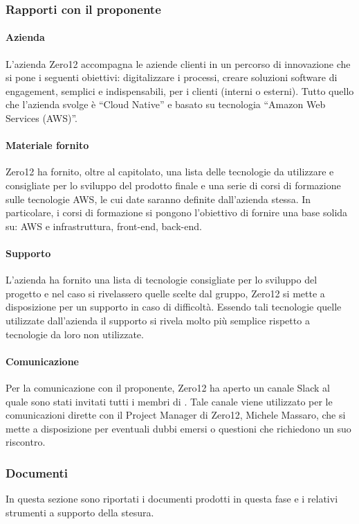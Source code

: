 \subsubsection{Rapporti con il proponente}
\paragraph{Azienda}
L’azienda Zero12 accompagna le aziende clienti in un percorso di innovazione che si pone i
seguenti obiettivi: digitalizzare i processi, creare soluzioni software di engagement, semplici e indispensabili, per i clienti (interni o esterni). Tutto quello che l’azienda svolge è “Cloud Native\glo{}” e basato su tecnologia “Amazon Web Services\glo{} (AWS)”.

\paragraph{Materiale fornito}
Zero12 ha fornito, oltre al capitolato, una lista delle tecnologie da utilizzare e consigliate per lo
sviluppo del prodotto finale e una serie di corsi di formazione sulle tecnologie AWS, le cui date
saranno definite dall’azienda stessa. In particolare, i corsi di formazione si pongono l'obiettivo di fornire una base solida su: AWS e infrastruttura, front-end\glo{}, back-end\glo{}.

\paragraph{Supporto}
L’azienda ha fornito una lista di tecnologie consigliate per lo sviluppo del progetto e nel caso si
rivelassero quelle scelte dal gruppo, Zero12 si mette a disposizione per un supporto in caso di
difficoltà. Essendo tali tecnologie quelle utilizzate dall’azienda il supporto si rivela molto più
semplice rispetto a tecnologie da loro non utilizzate.

\paragraph{Comunicazione}
Per la comunicazione con il proponente, Zero12 ha aperto un canale Slack\glo{} al quale sono stati
invitati tutti i membri di \groupName{}. Tale canale viene utilizzato per le comunicazioni dirette
con il Project Manager di Zero12, Michele Massaro, che si mette a disposizione per eventuali
dubbi emersi o questioni che richiedono un suo riscontro.

\subsubsection{Documenti}
In questa sezione sono riportati i documenti prodotti in questa fase e i relativi strumenti a supporto della stesura.

